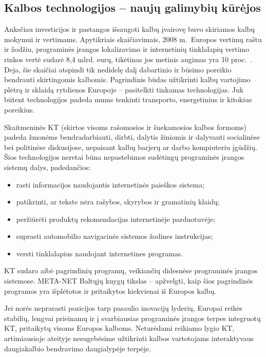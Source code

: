 \begin{multicols}{2}
\subsection{Kalbos technologijos – naujų galimybių kūrėjos}

Anksčiau investicijos ir pastangos išsaugoti kalbų įvairovę buvo skiriamos kalbų mokymui ir vertimams. Apytikriais skaičiavimais, 2008 m.~Europos vertimų raštu ir žodžiu, programinės įrangos lokalizavimo ir internetinių tinklalapių vertimo rinkos vertė sudarė 8,4 mlrd. eurų, tikėtinas jos metinis augimas yra 10 proc.~\cite{EC3}.  Deja, šie skaičiai atspindi tik nedidelę dalį dabartinio ir būsimo poreikio bendrauti skirtingomis kalbomis. Pagrindinis būdas užtikrinti kalbų vartojimo plėtrą ir sklaidą rytdienos Europoje – pasitelkti tinkamas technologijas. Juk būtent technologijos padeda mums tenkinti transporto, energetinius ir kitokius poreikius.


Skaitmeninės KT (skirtos visoms rašomosios ir šnekamosios kalbos formoms) padeda žmonėms bendradarbiauti, dirbti, dalytis žiniomis ir dalyvauti socialinėse bei politinėse diskusijose, nepaisant kalbų barjerų ar darbo kompiuteriu įgūdžių. Šios technologijos neretai būna nepastebimos sudėtingų programinės įrangos sistemų dalys, padedančios:

\begin{itemize}
\item rasti informacijos naudojantis internetinės paieškos sistema;
\item patikrinti, ar tekste nėra rašybos, skyrybos ir gramatinių klaidų;
\item peržiūrėti produktų rekomendacijas internetinėje parduotuvėje;
\item suprasti automobilio navigacinės sistemos žodines instrukcijas;
\item versti tinklalapius naudojant internetines programas.
\end{itemize}

KT sudaro aibė pagrindinių programų, veikiančių didesnėse programinės įrangos sistemose. META-NET Baltųjų knygų tikslas – apžvelgti, kaip šios pagrindinės programos yra išplėtotos ir pritaikytos kiekvienai iš Europos kalbų. 

Jei norės neprarasti pozicijos tarp pasaulio inovacijų lyderių, Europai reikės stabilių, lengvai prieinamų ir į svarbiausias programinės įrangos terpes integruotų KT, pritaikytų visoms Europos kalboms. Neturėdami reikiamo lygio KT, artimiausioje ateityje nesugebėsime užtikrinti kalbos vartotojams interaktyvaus daugiakalbio bendravimo daugialypėje terpėje.


\end{multicols}
